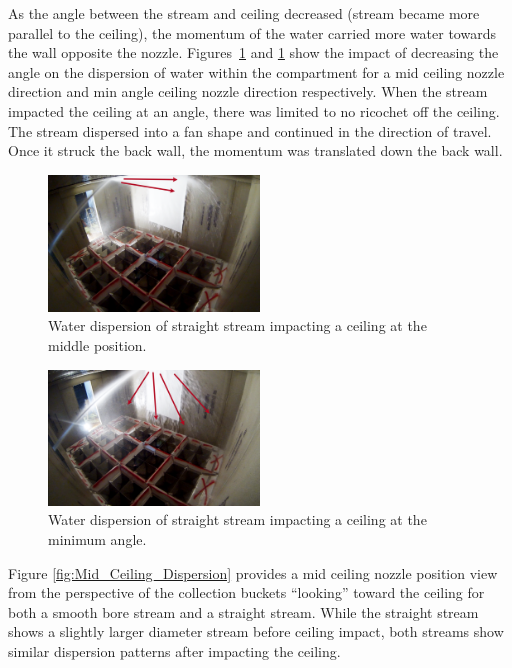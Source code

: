 \documentclass[12pt,oneside]{book}
\begin{document}
As the angle between the stream and ceiling decreased (stream became more parallel to the ceiling), the momentum of the water carried more water towards the wall opposite the nozzle. Figures~\ref{fig:MidCeilingImpact} and \ref{fig:MidCeilingImpact} show the impact of decreasing the angle on the dispersion of water within the compartment for a mid ceiling nozzle direction and min angle ceiling nozzle direction respectively. When the stream impacted the ceiling at an angle, there was limited to no ricochet off the ceiling. The stream dispersed into a fan shape and continued in the direction of travel. Once it struck the back wall, the momentum was translated down the back wall. 

\begin{figure}[!ht]
\centering
\includegraphics[width=0.5\textwidth]{Figures/Water_Distribution/Nozzle_Directions/Exterior_MidCeiling_SS_Arrows}
\caption[Water Dispersion Straight Stream Middle Position Ceiling]{Water dispersion of straight stream impacting a ceiling at the middle position.}
\label{fig:MidCeilingImpact}
\end{figure}

\begin{figure}[!ht]
\centering
\includegraphics[width=0.5\textwidth]{Figures/Water_Distribution/Nozzle_Directions/Exterior_MinAngleCeiling_SS_FirstFloor_Arrows}
\caption[Water Dispersion Straight Stream Minimum Angle Ceiling]{Water dispersion of straight stream impacting a ceiling at the minimum angle.}
\label{fig:MinAngleCeilingImpact}
\end{figure}

Figure \ref{fig:Mid_Ceiling_Dispersion} provides a mid ceiling nozzle position view from the perspective of the collection buckets ``looking'' toward the ceiling for both a smooth bore stream and a straight stream. While the straight stream shows a slightly larger diameter stream before ceiling impact, both streams show similar dispersion patterns after impacting the ceiling. 
\end{document}
